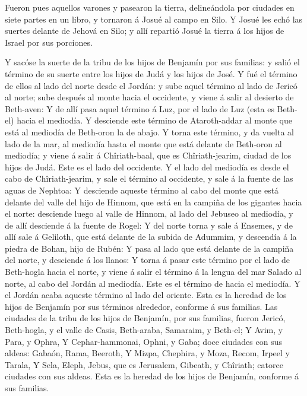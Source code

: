  Fueron pues aquellos varones y pasearon la tierra,
delineándola por ciudades en siete partes en un libro, y tornaron á
Josué al campo en Silo.  Y Josué les echó las suertes
delante de Jehová en Silo; y allí repartió Josué la tierra á los hijos
de Israel por sus porciones.

 Y sacóse la suerte de la tribu de los hijos de Benjamín
por sus familias: y salió el término de su suerte entre los hijos de
Judá y los hijos de José.  Y fué el término de ellos al
lado del norte desde el Jordán: y sube aquel término al lado de Jericó
al norte; sube después al monte hacia el occidente, y viene á salir al
desierto de Beth-aven:  Y de allí pasa aquel término á Luz,
por el lado de Luz (esta es Beth-el) hacia el mediodía. Y desciende este
término de Ataroth-addar al monte que está al mediodía de Beth-oron la
de abajo.  Y torna este término, y da vuelta al lado de la
mar, al mediodía hasta el monte que está delante de Beth-oron al
mediodía; y viene á salir á Chîriath-baal, que es Chîriath-jearim,
ciudad de los hijos de Judá. Este es el lado del occidente.
 Y el lado del mediodía es desde el cabo de
Chîriath-jearim, y sale el término al occidente, y sale á la fuente de
las aguas de Nephtoa:  Y desciende aqueste término al cabo
del monte que está delante del valle del hijo de Hinnom, que está en la
campiña de los gigantes hacia el norte: desciende luego al valle de
Hinnom, al lado del Jebuseo al mediodía, y de allí desciende á la fuente
de Rogel:  Y del norte torna y sale á Ensemes, y de allí
sale á Geliloth, que está delante de la subida de Adummim, y descendía á
la piedra de Bohan, hijo de Rubén:  Y pasa al lado que está
delante de la campiña del norte, y desciende á los llanos: 
Y torna á pasar este término por el lado de Beth-hogla hacia el norte, y
viene á salir el término á la lengua del mar Salado al norte, al cabo
del Jordán al mediodía. Este es el término de hacia el mediodía.
 Y el Jordán acaba aqueste término al lado del oriente.
Esta es la heredad de los hijos de Benjamín por sus términos alrededor,
conforme á sus familias.  Las ciudades de la tribu de los
hijos de Benjamín, por sus familias, fueron Jericó, Beth-hogla, y el
valle de Casis,  Beth-araba, Samaraim, y Beth-el;
 Y Avim, y Para, y Ophra,  Y Cephar-hammonai,
Ophni, y Gaba; doce ciudades con sus aldeas:  Gabaón, Rama,
Beeroth,  Y Mizpa, Chephira, y Moza,  Recom,
Irpeel y Tarala,  Y Sela, Eleph, Jebus, que es Jerusalem,
Gibeath, y Chîriath; catorce ciudades con sus aldeas. Esta es la heredad
de los hijos de Benjamín, conforme á sus familias.

